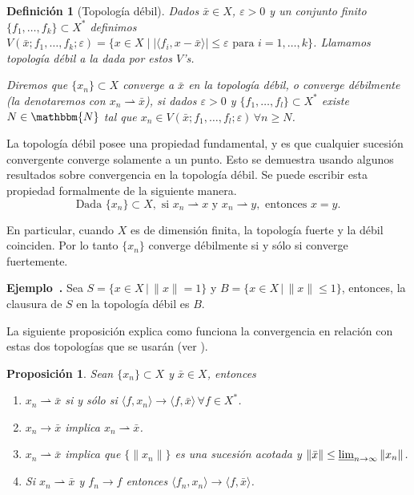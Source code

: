 \documentclass[a4paper,10pt]{book}
\newcommand{\N}{\mathbbm{N}}
\newcommand{\bx}{\bar{x}}
\newcommand{\la}{\langle}
\newcommand{\ra}{\rangle}
\newcommand{\deb}{\rightharpoonup}
\newtheorem{prop}[teo]{Proposici\'on}
\newtheorem{defi}[teo]{Definici\'on}
\newcounter{ejem}[section]
\newenvironment{ejem}[1][]{\refstepcounter{ejem}\par\medskip
   \noindent \textbf{Ejemplo~\theejem. #1} \rmfamily}{\medskip}
\begin{document}
\begin{defi}[Topología débil]
Dados $\bx\in X$, $\varepsilon>0$ y un conjunto finito $\{f_1,\ldots,f_k\}\subset X^*$ definimos $V(\bx;f_1,\ldots,f_k;\varepsilon)=\{x\in X \mid |\la f_i , x-\bx\ra|\leq\varepsilon\mbox{ para }i=1,\ldots,k\}$. Llamamos topología débil a la dada por estos $V$'s.

Diremos que $\{x_n\}\subset X$ converge a $\bx$ en la topología débil, o converge débilmente (la denotaremos con $x_n\deb \bx$), si dados $\varepsilon>0$ y $\{f_1,\ldots,f_l\}\subset X^*$ existe $N\in \N$ tal que $x_n\in V(\bx;f_1,\ldots,f_l;\varepsilon)\,\forall n\geq N$.
\end{defi}

La topología débil posee una propiedad fundamental, y es que cualquier sucesión convergente converge solamente a un punto. Esto se demuestra usando algunos resultados sobre convergencia en la topología débil. Se puede escribir esta propiedad formalmente de la siguiente manera. $$\mbox{Dada } \{x_n\}\subset X, \mbox{ si } x_n\deb x \mbox{ y }x_n\deb y, \mbox{ entonces } x=y.$$

En particular, cuando $X$ es de dimensión finita, la topología fuerte y la débil coinciden. Por lo tanto $\{x_n\}$ converge débilmente si y sólo si converge fuertemente.



\begin{ejem}
Sea $S=\{x\in X\,|\, \|x\|=1\}$ y $B=\{x\in X\,|\,\|x\|\leq1\}$, entonces, la clausura de $S$ en la topología débil es $B$.
\end{ejem}

La siguiente proposición explica como funciona la convergencia en relación con estas dos topologías que se usarán (ver \cite[Proposition 3.5.]{brezis2010functional}).
\begin{prop}
 Sean $\{x_n\}\subset X$ y $\bx\in X$, entonces
 \begin{enumerate}
 \item $x_n\deb \bx$ si y sólo si $\la f,x_n\ra\to\la f,\bx\ra\,\forall f\in X^*$.
 \item $x_n\to \bx$ implica $x_n\deb \bx$.
 \item $x_n\deb\bx$ implica que $\{\|x_n\|\}$ es una sucesión acotada y $\|\bx\|\leq\varliminf_{n\to\infty}\|x_n\|$.
 \item Si $x_n\deb\bx$ y $f_n\to f$ entonces $\la f_n,x_n\ra\to\la f,\bx\ra$. 
 \end{enumerate}
\end{prop}
\end{document}
